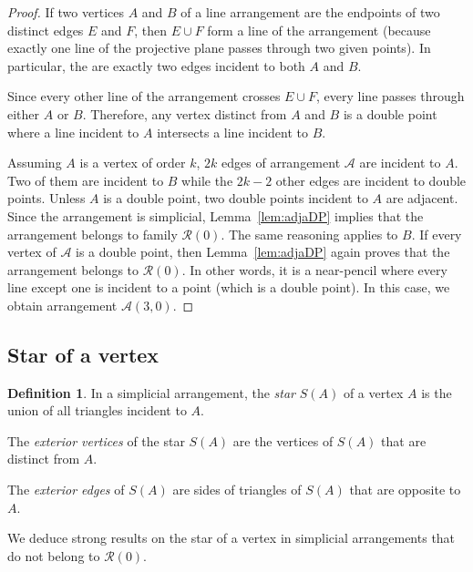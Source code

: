 \documentclass[a4paper,11pt,reqno]{amsart}
\theoremstyle{definition}
\newtheorem{defn}[thm]{Definition}
\theoremstyle{remark}
\theoremstyle{definition}
\theoremstyle{definition}
\theoremstyle{definition}
\numberwithin{equation}{section}
\begin{document}
\begin{proof}
If two vertices $A$ and $B$ of a line arrangement are the endpoints of two distinct edges $E$ and $F$, then $E \cup F$ form a line of the arrangement (because exactly one line of the projective plane passes through two given points). In particular, the are exactly two edges incident to both $A$ and $B$.
\par
Since every other line of the arrangement crosses $E \cup F$,  every line passes through either $A$ or $B$. Therefore, any vertex distinct from $A$ and $B$ is a double point where a line incident to $A$ intersects a line incident to $B$.
\par
Assuming $A$ is a vertex of order $k$, $2k$ edges of arrangement $\mathcal{A}$ are incident to $A$. Two of them are incident to $B$ while the $2k-2$ other edges are incident to double points. Unless $A$ is a double point, two double points incident to $A$ are adjacent. Since the arrangement is simplicial, Lemma~\ref{lem:adjaDP} implies that the arrangement belongs to family $\mathcal{R}(0)$. The same reasoning applies to $B$. If every vertex of $\mathcal{A}$ is a double point, then Lemma~\ref{lem:adjaDP} again proves that the arrangement belongs to $\mathcal{R}(0)$. In other words, it is a near-pencil where every line except one is incident to a point (which is a double point). In this case, we obtain arrangement $\mathcal{A}(3,0)$.
\end{proof}

\subsection{Star of a vertex}\label{sub:star}

\begin{defn}
In a simplicial arrangement, the \textit{star} $S(A)$ of a vertex $A$ is the union of all triangles incident to $A$.
\par
The \textit{exterior vertices} of the star $S(A)$ are the vertices of $S(A)$ that are distinct from $A$.
\par
The \textit{exterior edges} of $S(A)$ are sides of triangles of $S(A)$ that are opposite to $A$.
\end{defn}

We deduce strong results on the star of a vertex in simplicial arrangements that do not belong to $\mathcal{R}(0)$.
\end{document}
